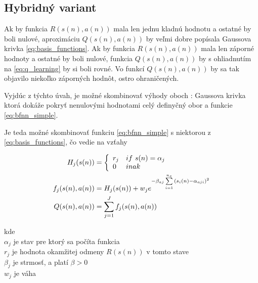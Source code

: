\subsection{Hybridný variant}

Ak by funkcia $R(s(n), a(n))$ mala len jednu kladnú hodnotu a ostatné by boli
nulové, aproximáciu $Q(s(n), a(n))$ by veľmi dobre popísala Gaussova krivka \ref{eq:basis_functions}.
Ak by funkcia $R(s(n), a(n))$ mala len záporné hodnoty a ostatné by boli
nulové, funkcia $Q(s(n), a(n))$ by s ohliadnutím na \ref{eq:q_learning} by
si boli rovné. Vo funkcí $Q(s(n), a(n))$ by sa tak objavilo niekoľko záporných
hodnôt, ostro ohraničených.

Vyjdúc z týchto úvah, je možné skombinovať výhody oboch : Gaussova krivka
ktorá dokáže pokryť nenulovými hodnotami celý definyčný obor a funkcie \ref{eq:bfnn_simple}.

Je teda možné skombinovať funkciu \ref{eq:bfnn_simple} s niektorou z \ref{eq:basis_functions},
čo vedie na vzťahy

\begin{align}
H_j(s(n)) &=
\left\{
	\begin{array}{ll}
		r_j  & if \ s(n) = \alpha_j \\
		0 & inak
	\end{array}
\right. \\
  f_j(\boldmath{s(n), a(n)}) &= H_j(s(n)) + w_j e^{ -\beta_{aj} \sum\limits_{i=1}^{n_s}{(s_i(n) - \alpha_{aji})^2 }} \\
  Q(s(n), a(n)) &= \sum\limits_{j=1}^{J} f_j(s(n), a(n))
\end{align}

kde \\
$\alpha_j$ je stav pre ktorý sa počíta funkcia \\
$r_j$ je hodnota okamžitej odmeny $R(s(n))$ v tomto stave \\
$\beta_j$ je strmosť, a platí $\beta > 0$ \\
$w_j$ je váha \\
